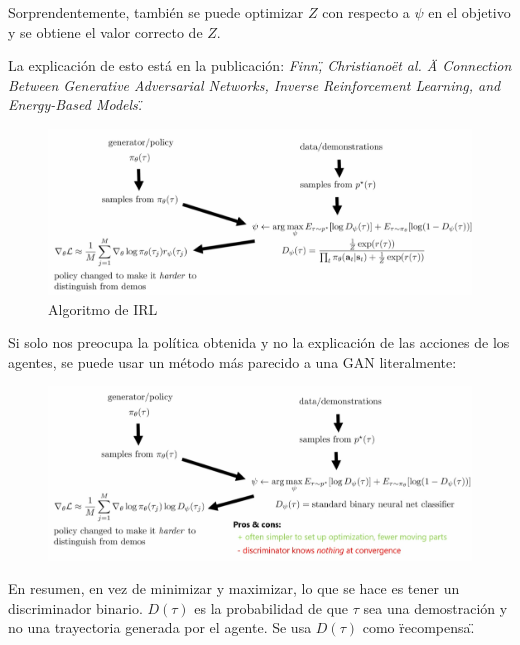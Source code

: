 Sorprendentemente, también se puede optimizar $Z$ con respecto a $\psi$ en el objetivo y se
obtiene el valor correcto de $Z$.

La explicación de esto está en la publicación: \textit{ Finn\", Christiano\" et al. \"A Connection Between Generative Adversarial Networks, Inverse Reinforcement Learning, and Energy-Based Models.\" }

\begin{figure}[H]
	\centering
	\includegraphics[width=0.8\linewidth]{figures/2020-07-06-164555_1021x400_scrot.png}
	\caption{Algoritmo de IRL}
\end{figure}

Si solo nos preocupa la política obtenida y no la explicación de las acciones de los
agentes, se puede usar un método más parecido a una GAN literalmente:
\begin{figure}[H]
	\centering
	\includegraphics[width=0.8\linewidth]{figures/2020-07-06-165353_1023x420_scrot.png}
\end{figure}
En resumen, en vez de minimizar y maximizar, lo que se hace es tener un discriminador
binario. $ D(\tau)$ es la probabilidad de que $\tau$ sea una demostración y no una trayectoria
generada por el agente. Se usa $D(\tau)$ como \"recompensa\".

